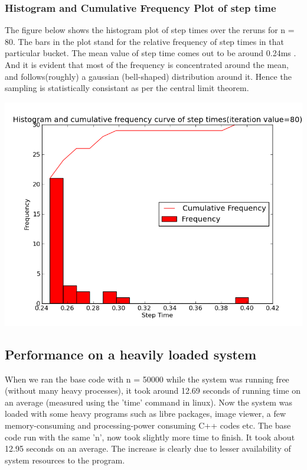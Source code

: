 \documentclass[11pt]{article}
\begin{document}
\subsubsection{Histogram and Cumulative Frequency Plot of step time}
The figure below shows the histogram plot of step times over the reruns for n = 80. The bars in the plot stand for the relative frequency of step times in that particular bucket. The mean value of step time comes out to be around 0.24ms . And it is evident that most of the frequency is concentrated around the mean, and follows(roughly) a gaussian (bell-shaped) distribution around it. Hence the sampling is statistically consistant as per the central limit theorem. 

\begin{center} 
\includegraphics [scale=0.45]{./images/g29_plot04} 
\end{center}

\subsection{Performance on a heavily loaded system}
When we ran the base code with n = 50000 while the system was running free (without many heavy processes), it took around 12.69 seconds of running time on an average (measured using the 'time' command in linux). Now the system was loaded with some heavy programs such as libre packages, image viewer, a few memory-consuming and processing-power consuming C++ codes etc. The base code run with the same 'n', now took slightly more time to finish. It took about 12.95 seconds on an average. The increase is clearly due to lesser availability of system resources to the program. 
\end{document}
